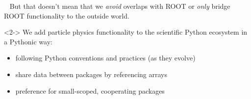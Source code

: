 \documentclass[aspectratio=169]{beamer}
\begin{document}
\begin{frame}{\mbox{ }}
\Large
But that doesn't mean that we {\it avoid} overlaps with ROOT or {\it only} bridge ROOT functionality to the outside world.

\vspace{1 cm}
\begin{uncoverenv}<2->
We add particle physics functionality to the scientific Python ecosystem in a Pythonic way:

\begin{itemize}
\item<3-> following Python conventions and practices (as they evolve)
\item<4-> share data between packages by referencing arrays
\item<5-> preference for small-scoped, cooperating packages
\end{itemize}
\end{uncoverenv}
\end{frame}
\end{document}

